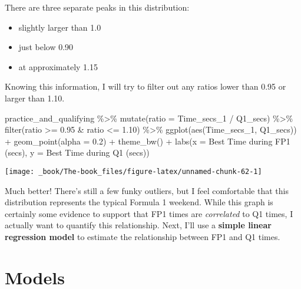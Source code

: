 \documentclass[
]{book}
\newenvironment{Shaded}{\begin{snugshade}}{\end{snugshade}}
\newcommand{\AttributeTok}[1]{\textcolor[rgb]{0.77,0.63,0.00}{#1}}
\newcommand{\FloatTok}[1]{\textcolor[rgb]{0.00,0.00,0.81}{#1}}
\newcommand{\FunctionTok}[1]{\textcolor[rgb]{0.00,0.00,0.00}{#1}}
\newcommand{\NormalTok}[1]{#1}
\newcommand{\SpecialCharTok}[1]{\textcolor[rgb]{0.00,0.00,0.00}{#1}}
\newcommand{\StringTok}[1]{\textcolor[rgb]{0.31,0.60,0.02}{#1}}
\providecommand{\tightlist}{%
  \setlength{\itemsep}{0pt}\setlength{\parskip}{0pt}}
\begin{document}
There are three separate peaks in this distribution:

\begin{itemize}
\tightlist
\item
  slightly larger than 1.0
\item
  just below 0.90
\item
  at approximately 1.15
\end{itemize}

Knowing this information, I will try to filter out any ratios lower than 0.95 or larger than 1.10.

\begin{Shaded}
\begin{Highlighting}[]
\NormalTok{practice\_and\_qualifying }\SpecialCharTok{\%\textgreater{}\%}
  \FunctionTok{mutate}\NormalTok{(}\AttributeTok{ratio =}\NormalTok{ Time\_secs\_1 }\SpecialCharTok{/}\NormalTok{ Q1\_secs) }\SpecialCharTok{\%\textgreater{}\%} 
  \FunctionTok{filter}\NormalTok{(ratio }\SpecialCharTok{\textgreater{}=} \FloatTok{0.95} \SpecialCharTok{\&}\NormalTok{ ratio }\SpecialCharTok{\textless{}=} \FloatTok{1.10}\NormalTok{) }\SpecialCharTok{\%\textgreater{}\%} 
  \FunctionTok{ggplot}\NormalTok{(}\FunctionTok{aes}\NormalTok{(Time\_secs\_1, Q1\_secs)) }\SpecialCharTok{+}
  \FunctionTok{geom\_point}\NormalTok{(}\AttributeTok{alpha =} \FloatTok{0.2}\NormalTok{) }\SpecialCharTok{+}
  \FunctionTok{theme\_bw}\NormalTok{() }\SpecialCharTok{+}
  \FunctionTok{labs}\NormalTok{(}\AttributeTok{x =} \StringTok{\textquotesingle{}Best Time during FP1 (secs)\textquotesingle{}}\NormalTok{,}
       \AttributeTok{y =} \StringTok{\textquotesingle{}Best Time during Q1 (secs)\textquotesingle{}}\NormalTok{)}
\end{Highlighting}
\end{Shaded}

\begin{center}\texttt{[image: \_book/The-book\_files/figure-latex/unnamed-chunk-62-1]} \end{center}

Much better! There's still a few funky outliers, but I feel comfortable that this distribution represents the typical Formula 1 weekend. While this graph is certainly some evidence to support that FP1 times are \emph{correlated} to Q1 times, I actually want to quantify this relationship. Next, I'll use a \textbf{simple linear regression model} to estimate the relationship between FP1 and Q1 times.

\hypertarget{models}{%
\section{Models}\label{models}}
\end{document}
